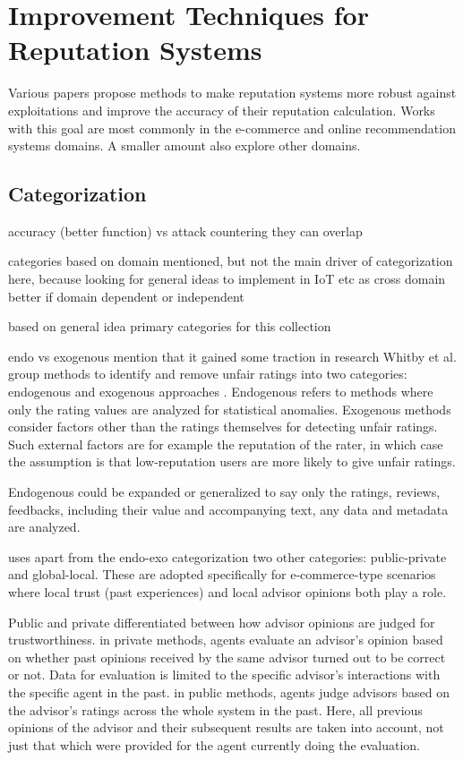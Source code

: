 \documentclass[%
    ]{\PathToTumTemplate/thesis/tum_thesis}
\begin{document}
\section{Improvement Techniques for Reputation Systems}\label{sec:sota_nolink_todo}

Various papers propose methods to make reputation systems more robust against exploitations and improve the accuracy of their reputation calculation. Works with this goal are most commonly in the e-commerce and online recommendation systems domains. A smaller amount also explore other domains. 


\subsection{Categorization}

accuracy (better function) vs attack countering
they can overlap

categories based on domain 
mentioned, but not the main driver of categorization here, because looking for general ideas to implement in IoT etc as cross domain
better if domain dependent or independent

based on general idea
primary categories for this collection

endo vs exogenous
mention that it gained some traction in research
Whitby et al. group methods to identify and remove unfair ratings into two categories: endogenous and exogenous approaches \cite{whitby_filtering_2014}. Endogenous refers to methods where only the rating values are analyzed for statistical anomalies. Exogenous methods consider factors other than the ratings themselves for detecting unfair ratings. Such external factors are for example the reputation of the rater, in which case the assumption is that low-reputation users are more likely to give unfair ratings.

Endogenous could be expanded or generalized to say only the ratings, reviews, feedbacks, including their value and accompanying text, any data and metadata are analyzed.

\cite{zhang_detailed_2008} uses apart from the endo-exo categorization two other categories: public-private and global-local. These are adopted specifically for e-commerce-type scenarios where local trust (past experiences) and local advisor opinions both play a role.

Public and private differentiated between how advisor opinions are judged for trustworthiness.
in private methods, agents evaluate an advisor's opinion based on whether past opinions received by the same advisor turned out to be correct or not. Data for evaluation is limited to the specific advisor's interactions with the specific agent in the past.
in public methods, agents judge advisors based on the advisor's ratings across the whole system in the past. Here, all previous opinions of the advisor and their subsequent results are taken into account, not just that which were provided for the agent currently doing the evaluation.
\end{document}
